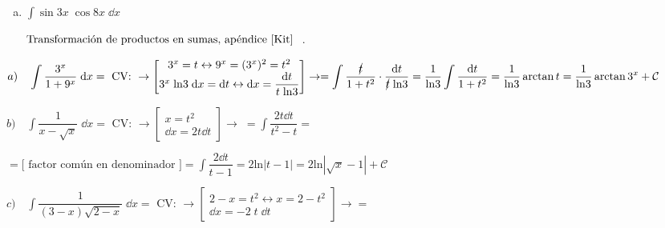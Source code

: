 {\begin{ejer}
\begin{multicols}{2}
\begin{enumerate}[a) ]
\item $\displaystyle \int \sin3x \; \cos 8x  \; \dd x$

\scriptsize{$\text {Transformación de productos en sumas, apéndice \ref{Kit}  } $} \normalsize{.}
	
\end{enumerate}

\end{multicols}

\end{ejer}


\begin{proofw}\renewcommand{\qedsymbol}{$\diamond$}	 
	
\hspace{7mm} $a) \quad \displaystyle \int \dfrac {3^x}{1+9^x} \; \dd x =\text { CV: } \to  \left[ \begin{matrix} 3^x=t \leftrightarrow 9^x=(3^x)^2=t^2 \\ 3^x \; \mathrm{ln}3\; \dd x = \dd t \leftrightarrow \dd x = \dfrac {\dd t}{t \; \mathrm{ln}3}  \end{matrix} \right] \to =  \displaystyle \int \dfrac {\cancel{t}}{1+t^2} \cdot \dfrac {\dd t}{\cancel{t} \; \mathrm{ln}3} =  \dfrac {1}{\mathrm{ln} 3} \int \dfrac {\dd t}{1+t^2}=\dfrac {1}{\mathrm{ln} 3} \arctan t= \dfrac {1}{\mathrm{ln}3} \arctan 3^x + \mathcal C$

\vspace{4mm}
$b) \quad \displaystyle \int \dfrac {1}{x-\sqrt{x}} \; \dd x = \text { CV: } \to \left[ \begin{matrix} x=t^2 \\ \dd x =2 t \dd t \end{matrix} \right] \to \;  =  \int \dfrac {2 t \dd t}{t^2 -t}=$

$= \text {[ factor común en denominador ]} = \int \dfrac {2  \dd t}{t -1}= 2 \mathrm{ln} |t-1|=2 \mathrm{ln} |\sqrt{x}-1|+\mathcal C$	

\vspace{4mm}
$c) \quad \displaystyle \int \dfrac {1}{(3-x)\sqrt{2-x}} \; \dd x = \text { CV: } \to \left[ \begin{matrix}2-x=t^2 \leftrightarrow x=2-t^2  \\  \dd x = -2 \; t \;  \dd t \end{matrix} \right] \to =$


\end{proofw}}
